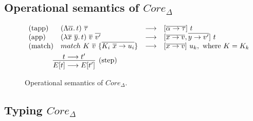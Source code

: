 \documentclass[11pt]{article}
\newcommand{\ap}{~}
\begin{document}
    \subsection{Operational semantics of $Core_\Delta$}

    \begin{figure}
        \begin{gather*}
            \begin{array}{llll}
                \text{(tapp)} &(\Lambda \overline{\alpha}\ldotp t) \ap \overline{\tau} &\longrightarrow &[\overline{\alpha\to\tau}]\ap t
                \\
                \text{(app)} &(\lambda \overline{x}~\overline{y}\ldotp t) \ap \overline{v} \ap \overline{v'} &\longrightarrow &[\overline{x\to v}, \overline{y\to v'}]\ap t
                \\
                \text{(match)} &match ~K \ap \overline{v} ~ \{ \overline{K_i \ap \overline{x} \to u_i}\} &\longrightarrow &[\overline{x\to v}]\ap u_k, \text{ where } K = K_k
            \end{array}\\
            \hspace{-15em}\infer[\text{(step)}]{E[t]\longrightarrow E[t']}{t\longrightarrow t'}
        \end{gather*}
        \caption{Operational semantics of $Core_\Delta$.}
        \label{fig:core-operational}
    \end{figure}

    \subsection{Typing $Core_\Delta$}
\end{document}
